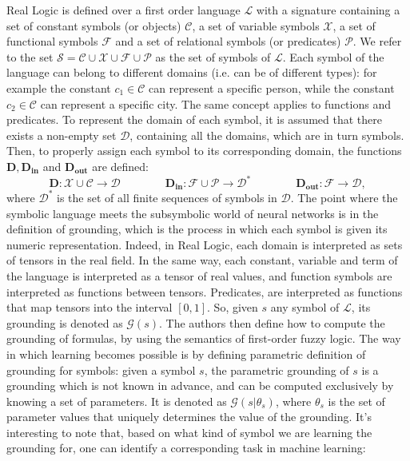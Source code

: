  Real Logic is defined over a first order language $\mathcal{L}$ with a signature containing a set of constant symbols (or objects) $\mathcal{C}$, a set of variable symbols $\mathcal{X}$, a set of functional symbols $\mathcal{F}$ and a set of relational symbols (or predicates) $\mathcal{P}$. We refer to the set $\mathcal{S} = \mathcal{C} \cup \mathcal{X} \cup \mathcal{F} \cup  \mathcal{P}$ as the set of symbols of $\mathcal{L}$. Each symbol of the language can belong to different domains (i.e. can be of different types): for example the constant $c_1 \in \mathcal{C}$ can represent a specific person, while the constant $c_2 \in \mathcal{C}$ can represent a specific city. The same concept applies to functions and predicates. To represent the domain of each symbol, it is assumed that there exists a non-empty set $\mathcal{D}$, containing all the domains, which are in turn symbols. Then, to properly assign each symbol to its corresponding domain, the functions $\mathbf{D}, \mathbf{D_{in}}$ and $\mathbf{D_{out}}$ are defined:
 \begin{equation*}
 \mathbf{D}: \mathcal{X} \cup \mathcal{C} \rightarrow\mathcal{D}
 \qquad \qquad
 \mathbf{D_{in}}: \mathcal{F} \cup \mathcal{P} \rightarrow\mathcal{D^*}
 \qquad \qquad 
 \mathbf{D_{out}}: \mathcal{F} \rightarrow\mathcal{D},
 \end{equation*}
 where $\mathcal{D^*}$ is the set of all finite sequences of symbols in $\mathcal{D}$.
 The point where the symbolic language meets the subsymbolic world of neural networks is in the definition of grounding, which is the process in which each symbol is given its numeric representation. Indeed, in Real Logic, each domain is interpreted as sets of tensors in the real field. In the same way, each constant, variable and term of the language is interpreted as a tensor of real values, and function symbols are interpreted as functions between tensors. Predicates, are interpreted as functions that map tensors into the interval $[0,1]$. So, given $s$ any symbol of $\mathcal{L}$, its grounding is denoted as $\mathcal{G}(s)$. 
 The authors then define how to compute the grounding of formulas, by using the semantics of first-order fuzzy logic. 
 The way in which learning becomes possible is by defining parametric definition of grounding for symbols: given a symbol $s$, the parametric grounding of $s$ is a grounding which is not known in advance, and can be computed exclusively by knowing a set of parameters. It is denoted as $\mathcal{G}(s|\theta_s)$, where $\theta_s$ is the set of parameter values that uniquely determines the value of the grounding. It's interesting to note that, based on what kind of symbol we are learning the grounding for, one can identify a corresponding task in machine learning:
